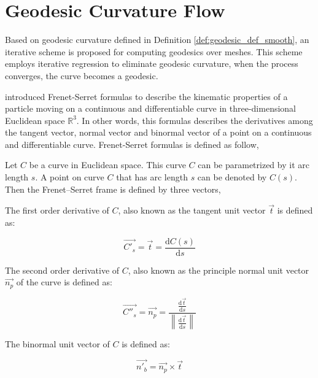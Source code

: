 		
			
\section{Geodesic Curvature Flow}
								
Based on geodesic curvature defined in Definition \ref{def:geodesic_def_smooth}, an iterative scheme is proposed for computing geodesics over meshes. This scheme employs iterative regression to eliminate geodesic curvature, when the process converges, the curve becomes a geodesic.

 introduced Frenet-Serret formulas to describe the kinematic properties of a particle moving on a continuous and differentiable curve in three-dimensional Euclidean space $\mathbb{R}^{3}$. In other words, this formulas describes the derivatives among the tangent vector, normal vector and binormal vector of a point on a continuous and differentiable curve. Frenet-Serret formulas is defined as follow,

Let $C$ be a curve in Euclidean space. This curve $C$ can be parametrized by it arc length $s$. A point on curve $C$ that has arc length $s$ can be denoted by $C(s)$. Then the Frenet–Serret frame is defined by three vectors,

The first order derivative of $C$, also known as the tangent unit vector $\vec{t}$ is defined as:

\begin{equation}
\vec{C'_{s}} = \vec{t} = \frac{\mathrm{d}C(s)}{\mathrm{d} s}
\label{equation:Frenet_Serret_tangent}
\end{equation}

The second order derivative of $C$, also known as the principle normal unit vector $\vec{n_{p}}$ of the curve is defined as:

\begin{equation}
\vec{C''_{s}} = \vec{n_{p}} = \frac{\frac{\mathrm{d}\vec{t} }{\mathrm{d} s}}{\left \| \frac{\mathrm{d}\vec{t} }{\mathrm{d} s} \right \|}
\label{equation:Frenet_Serret_normal}
\end{equation}

The binormal unit vector of $C$ is defined as:

\begin{equation}
\vec{n'_{b}} = \vec{n_{p}} \times \vec{t}
\label{equation:Frenet_Serret_binormal}
\end{equation}

